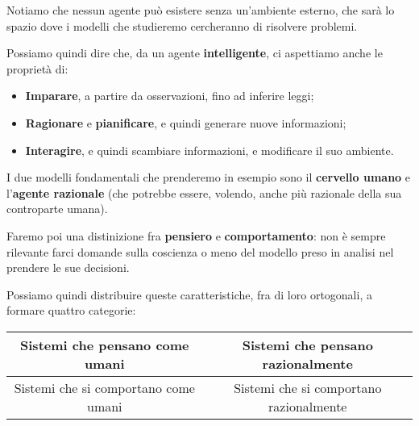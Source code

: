 \documentclass[a4paper,11pt]{article}
\begin{document}
\begin{center}
\end{center}

Notiamo che nessun agente può esistere senza un'ambiente esterno, che sarà lo spazio dove i modelli che studieremo cercheranno di risolvere problemi.

Possiamo quindi dire che, da un agente \textbf{intelligente}, ci aspettiamo anche le proprietà di:
\begin{itemize}
	\item \textbf{Imparare}, a partire da osservazioni, fino ad inferire leggi;
	\item \textbf{Ragionare} e \textbf{pianificare}, e quindi generare nuove informazioni;
	\item \textbf{Interagire}, e quindi scambiare informazioni, e modificare il suo ambiente.
\end{itemize}

I due modelli fondamentali che prenderemo in esempio sono il \textbf{cervello umano} e l'\textbf{agente razionale} (che potrebbe essere, volendo, anche più razionale della sua controparte umana).

Faremo poi una distinizione fra \textbf{pensiero} e \textbf{comportamento}: non è sempre rilevante farci domande sulla coscienza o meno del modello preso in analisi nel prendere le sue decisioni.

Possiamo quindi distribuire queste caratteristiche, fra di loro ortogonali, a formare quattro categorie:
\begin{table}[h!]
	\center 
	\begin{tabular} { c | c  }
		Sistemi che pensano come umani & Sistemi che pensano razionalmente \\ 
		\hline 
		Sistemi che si comportano come umani & Sistemi che si comportano razionalmente
	\end{tabular}
\end{table}
\end{document}
